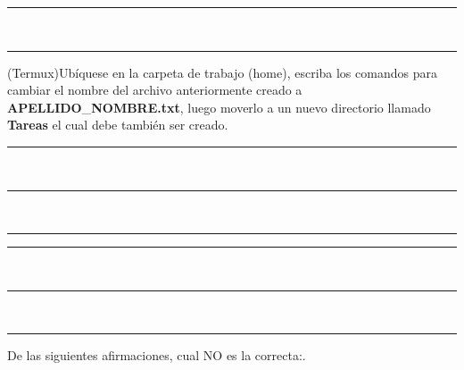 \documentclass[12pt]{exam}
\begin{document}
\begin{questions}
\begin{minipage}[H]{0.40\linewidth}
  
    \noindent \rule{7cm}{0.4pt} \\
  
    \noindent \rule{7cm}{0.4pt}
\end{minipage}


\question[20] (Termux)Ubíquese en la carpeta de trabajo (home), escriba los
comandos  para  cambiar el nombre del archivo anteriormente creado  a \textbf{APELLIDO}\_\textbf{NOMBRE}\textbf{.txt}, luego moverlo a un
nuevo directorio llamado \textbf{Tareas} el cual debe también
ser creado.\\

\begin{minipage}[H]{0.40\linewidth}
  \noindent \rule{7cm}{0.4pt} \\
  

  
  \noindent \rule{7cm}{0.4pt} \\
  
  \noindent \rule{7cm}{0.4pt}
\end{minipage} \hspace{2cm} 
\begin{minipage}[H]{0.40\linewidth}
    \noindent \rule{7cm}{0.4pt} \\
  
  
    \noindent \rule{7cm}{0.4pt} \\
  
    \noindent \rule{7cm}{0.4pt}
\end{minipage}

\newpage


\question[20] De las siguientes afirmaciones, cual NO es la correcta:.

\end{questions}
\end{document}
